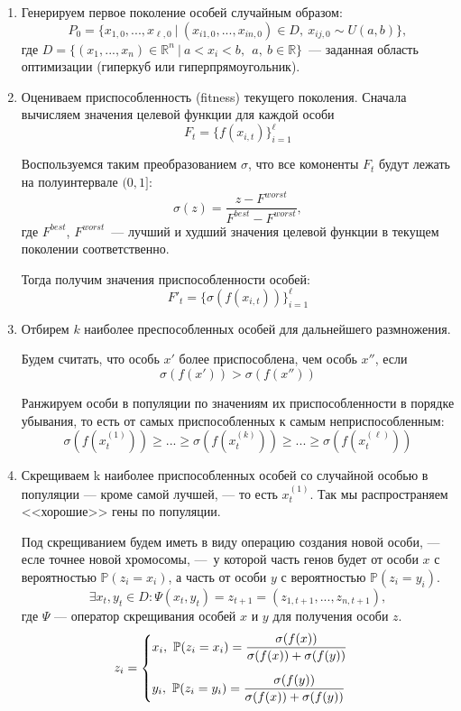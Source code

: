 \begin{enumerate}
	\item Генерируем первое поколение особей случайным образом:
	\[
		P_0 = \{x_{1, 0}, ..., x_{\ell, 0} \ | \ (x_{i1, 0}, ..., x_{in, 0}) \in D, \  x_{ij, 0} \sim U(a, b)\},
	\]
	где $D = \{(x_1, ..., x_n) \in \mathbb{R}^n \ | \  a < x_i < b,\ \ a,\ b \in \mathbb{R} \} $~--- заданная область оптимизации (гиперкуб или гиперпрямоугольник).

	\item Оцениваем приспособленность (fitness) текущего поколения.
	Сначала вычисляем значения целевой функции  для каждой особи
	\[
		F_t = \{f(x_{i,t})\}_{i=1}^\ell
	\]

	Воспользуемся таким преобразованием $\sigma$, что все комоненты $F_t$ будут лежать на полуинтервале $(0, 1]$:
	\[
		\sigma(z) = \dfrac{z - F^{worst}}{F^{best} - F^{worst}},
	\]
	где $F^{best}$, $F^{worst}$~--- лучший и худший значения целевой функции в текущем поколении соответственно.


	Тогда получим значения приспособленности особей:
	\[
	F'_t = \{\sigma(f(x_{i, t}))\}_{i=1}^\ell
	\]

	\item  Отбирем $k$ наиболее преспособленных особей для дальнейшего размножения.

	Будем считать, что особь $x'$ более приспособлена, чем особь $x''$, если
	\[
		\sigma(f(x')) > \sigma(f(x''))
	\]

	Ранжируем особи в популяции по значениям их приспособленности в порядке убывания, то есть от самых приспособленных к самым неприспособленным:
	\[
		\sigma(f(x^{(1)}_t)) \geq ... \geq \sigma(f(x^{(k)}_t)) \geq ... \geq \sigma(f(x^{(\ell)}_t))
	\]

	\item Скрещиваем k наиболее приспособленных особей со случайной особью в популяции --- кроме самой лучшей, --- то есть $x^{(1)}_t$. Так мы распространяем <<хорошие>> гены по популяции.

	Под скрещиванием будем иметь в виду операцию создания новой особи, — есле точнее новой хромосомы, — у которой часть генов будет от особи $x$ с вероятностью $\mathbb{P}(z_i = x_i)$, а часть от особи $y$ с вероятностью $\mathbb{P}(z_i = y_i)$.
	\[
		\exists x_t, y_t \in D \colon \Psi(x_t,y_t) = z_{t + 1} = (z_{1,t + 1}, ..., z_{n, t + 1}),
	\]
	где $\Psi$ --- оператор скрещивания особей $x$ и $y$ для получения особи $z$.
\[
z_i
=
\begin{cases}
	x_i, \ \mathbb{P}(z_i = x_i) = \dfrac{\sigma(f(x))}{\sigma(f(x)) + \sigma(f(y))} \\
	\vspace{-5pt} \\
	y_i, \ \mathbb{P}(z_i = y_i) = \dfrac{\sigma(f(y))}{\sigma(f(x)) + \sigma(f(y))}
\end{cases}
\]


\end{enumerate}

